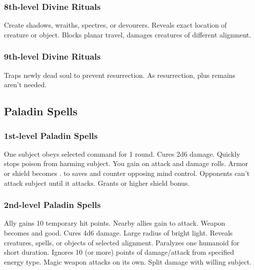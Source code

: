 \subsubsection{8th-level Divine Rituals}
\begin{rituallist}
     Create shadows, wraiths, spectres, or devourers.
     Reveals exact location of creature or object.
     Blocks planar travel, damages creatures of different alignment.
\end{rituallist}

\subsubsection{9th-level Divine Rituals}
\begin{rituallist}
    \F Traps newly dead soul to prevent resurrection.
     As resurrection, plus remains aren't needed.
\end{rituallist}

\subsection{Paladin Spells}  

\subsubsection{1st-level Paladin Spells}
\begin{spelllist}
   One subject obeys selected command for 1 round.
   Cures 2d6 damage.
   Quickly stops poison from harming subject.
   You gain  on attack and damage rolls.
   Armor or shield becomes .
    to saves and counter opposing mind control.
   Opponents can't attack subject until it attacks.
   Grants  or higher shield bonus.
\end{spelllist}

\subsubsection{2nd-level Paladin Spells}
\begin{spelllist}
   Ally gains 10 temporary hit points.
   Nearby allies gain  to attack.
   Weapon becomes  and good.
   Cures 4d6 damage.
   Large radius of bright light.
   Reveals creatures, spells, or objects of selected alignment.
   Paralyzes one humanoid for short duration.
   Ignores 10 (or more) points of damage/attack from specified energy type.
   Magic weapon attacks on its own.
   Split damage with willing subject.
\end{spelllist}

